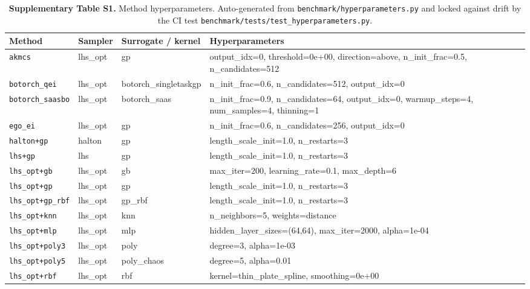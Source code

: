 \begin{table}[htbp]
\centering
\caption{\textbf{Supplementary Table S1.} Method hyperparameters.  Auto-generated from \texttt{benchmark/hyperparameters.py} and locked against drift by the CI test \texttt{benchmark/\allowbreak tests/\allowbreak test\_hyperparameters.py}.}
\label{tab:si_hyperparameters}
\footnotesize
\setlength{\tabcolsep}{4pt}
\begin{tabular}{@{}llll@{}}
\toprule
\textbf{Method} & \textbf{Sampler} & \textbf{Surrogate / kernel} & \textbf{Hyperparameters} \\
\midrule
\texttt{akmcs} & lhs\_opt & gp & output\_idx=0, threshold=0e+00, direction=above, n\_init\_frac=0.5, n\_candidates=512 \\
\texttt{botorch\_qei} & lhs\_opt & botorch\_singletaskgp & n\_init\_frac=0.6, n\_candidates=512, output\_idx=0 \\
\texttt{botorch\_saasbo} & lhs\_opt & botorch\_saas & n\_init\_frac=0.9, n\_candidates=64, output\_idx=0, warmup\_steps=4, num\_samples=4, thinning=1 \\
\texttt{ego\_ei} & lhs\_opt & gp & n\_init\_frac=0.6, n\_candidates=256, output\_idx=0 \\
\texttt{halton+gp} & halton & gp & length\_scale\_init=1.0, n\_restarts=3 \\
\texttt{lhs+gp} & lhs & gp & length\_scale\_init=1.0, n\_restarts=3 \\
\texttt{lhs\_opt+gb} & lhs\_opt & gb & max\_iter=200, learning\_rate=0.1, max\_depth=6 \\
\texttt{lhs\_opt+gp} & lhs\_opt & gp & length\_scale\_init=1.0, n\_restarts=3 \\
\texttt{lhs\_opt+gp\_rbf} & lhs\_opt & gp\_rbf & length\_scale\_init=1.0, n\_restarts=3 \\
\texttt{lhs\_opt+knn} & lhs\_opt & knn & n\_neighbors=5, weights=distance \\
\texttt{lhs\_opt+mlp} & lhs\_opt & mlp & hidden\_layer\_sizes=(64,64), max\_iter=2000, alpha=1e-04 \\
\texttt{lhs\_opt+poly3} & lhs\_opt & poly & degree=3, alpha=1e-03 \\
\texttt{lhs\_opt+poly5} & lhs\_opt & poly\_chaos & degree=5, alpha=0.01 \\
\texttt{lhs\_opt+rbf} & lhs\_opt & rbf & kernel=thin\_plate\_spline, smoothing=0e+00 \\

\end{tabular}
\end{table}
